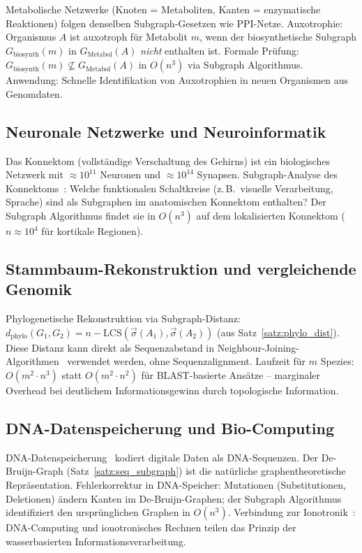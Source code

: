 ﻿\documentclass[a4paper,12pt]{article}
\theoremstyle{plain}
\theoremstyle{definition}
\theoremstyle{remark}
\newcommand{\sigvec}{\vec{\sigma}}
\begin{document}
Metabolische Netzwerke (Knoten = Metaboliten, Kanten = enzymatische
Reaktionen) folgen denselben Subgraph-Gesetzen wie PPI-Netze.
Auxotrophie: Organismus $A$ ist auxotroph f\"ur Metabolit $m$,
wenn der biosynthetische Subgraph $G_{\mathrm{biosynth}}(m)$ in
$G_{\mathrm{Metabol}}(A)$ \emph{nicht} enthalten ist.
Formale Pr\"ufung: $G_{\mathrm{biosynth}}(m) \not\subseteq G_{\mathrm{Metabol}}(A)$
in $O(n^3)$ via Subgraph Algorithmus.
Anwendung: Schnelle Identifikation von Auxotrophien in neuen Organismen
aus Genomdaten.

\subsection{Neuronale Netzwerke und Neuroinformatik}

Das Konnektom (vollst\"andige Verschaltung des Gehirns) ist ein biologisches
Netzwerk mit $\approx 10^{11}$ Neuronen und $\approx 10^{14}$ Synapsen.
Subgraph-Analyse des Konnektoms~\cite{sporns2005}: Welche funktionalen
Schaltkreise (z.\,B.\ visuelle Verarbeitung, Sprache) sind als Subgraphen
im anatomischen Konnektom enthalten?
Der Subgraph Algorithmus findet sie in $O(n^3)$ auf dem
lokalisierten Konnektom ($n \approx 10^4$ f\"ur kortikale Regionen).

\subsection{Stammbaum-Rekonstruktion und vergleichende Genomik}

Phylogenetische Rekonstruktion via Subgraph-Distanz:
$d_{\mathrm{phylo}}(G_1, G_2) = n - \mathrm{LCS}(\sigvec(A_1), \sigvec(A_2))$
(aus Satz~\ref{satz:phylo_dist}).
Diese Distanz kann direkt als Sequenzabstand in
Neighbour-Joining-Algorithmen~\cite{saitou1987} verwendet werden,
ohne Sequenzalignment.
Laufzeit f\"ur $m$ Spezies: $O(m^2 \cdot n^3)$ statt $O(m^2 \cdot n^2)$
f\"ur BLAST-basierte Ans\"atze -- marginaler Overhead bei deutlichem
Informationsgewinn durch topologische Information.

\subsection{DNA-Datenspeicherung und Bio-Computing}

DNA-Datenspeicherung~\cite{epp2026dnastor} kodiert digitale Daten als
DNA-Sequenzen. Der De-Bruijn-Graph (Satz~\ref{satz:seq_subgraph})
ist die nat\"urliche graphentheoretische Repr\"asentation.
Fehlerkorrektur in DNA-Speicher: Mutationen (Substitutionen, Deletionen)
\"andern Kanten im De-Bruijn-Graphen; der Subgraph Algorithmus
identifiziert den urspr\"unglichen Graphen in $O(n^3)$.
Verbindung zur Ionotronik~\cite{epp2026ionotronik}: DNA-Computing und
ionotronisches Rechnen teilen das Prinzip der wasserbasierten Informationsverarbeitung.
\end{document}
